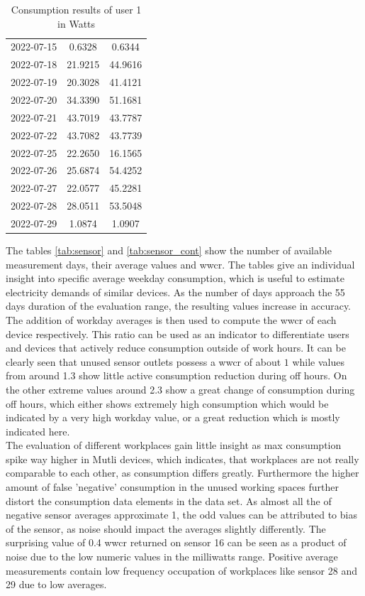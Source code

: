 \begin{table}
\begin{tabular}{|l|c|c|}
		\\ 2022-07-15   &0.6328&     0.6344
		\\ 2022-07-18  &21.9215&    44.9616
		\\ 2022-07-19  &20.3028&    41.4121
		\\ 2022-07-20  &34.3390&    51.1681
		\\ 2022-07-21  &43.7019&    43.7787
		\\ 2022-07-22  &43.7082&    43.7739
		\\ 2022-07-25  &22.2650&    16.1565
		\\ 2022-07-26  &25.6874&    54.4252
		\\ 2022-07-27  &22.0577&    45.2281
		\\ 2022-07-28  &28.0511&    53.5048
		\\ 2022-07-29   &1.0874&     1.0907
	\end{tabular}
	\caption{Consumption results of user 1 in Watts}
	\label{tab:user1}
\end{table}
The tables \ref{tab:sensor} and \ref{tab:sensor_cont} show the number of available measurement days, their average values and \acrfull{wwcr}. The tables give an individual insight into specific average weekday consumption, which is useful to estimate electricity demands of similar devices. As the number of days approach the 55 days duration of the evaluation range, the resulting values increase in accuracy. The addition of workday averages is then used to compute the \acrshort{wwcr} of each device respectively. This ratio can be used as an indicator to differentiate users and devices that actively reduce consumption outside of work hours. It can be clearly seen that unused sensor outlets possess a \acrshort{wwcr} of about $1$ while values from around 1.3 show little active consumption reduction during off hours. On the other extreme values around 2.3 show a great change of consumption during off hours, which either shows extremely high consumption which would be indicated by a very high \gls{workday} value, or a great reduction which is mostly indicated here.\\
The evaluation of different workplaces gain little insight as max consumption spike way higher in Mutli devices, which indicates, that workplaces are not really comparable to each other, as consumption differs greatly. Furthermore the higher amount of false 'negative' consumption in the unused working spaces further distort the consumption data elements in the data set. As almost all the  of negative sensor averages approximate 1, the odd values can be attributed to bias of the sensor, as noise should impact the averages slightly differently. The surprising value of 0.4 \acrshort{wwcr} returned on sensor 16 can be seen as a product of noise due to the low numeric values in the milliwatts range. Positive average measurements contain low frequency occupation of workplaces like sensor 28 and 29 due to low averages.\\

